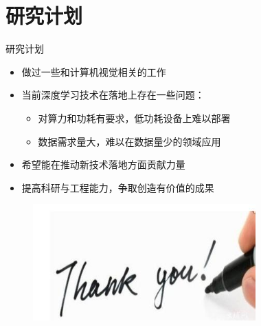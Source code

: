\documentclass{beamer}
\begin{document}
\section{研究计划}

\begin{frame}{研究计划}
  \begin{itemize}
    \item 做过一些和计算机视觉相关的工作
    \item 当前深度学习技术在落地上存在一些问题：
    \begin{itemize}
      \item 对算力和功耗有要求，低功耗设备上难以部署
      \item 数据需求量大，难以在数据量少的领域应用
    \end{itemize}
    \item 希望能在推动新技术落地方面贡献力量
    \item 提高科研与工程能力，争取创造有价值的成果
  \end{itemize}
\end{frame}


\begin{frame}
  \begin{figure}
    \includegraphics[height=4.46cm,width=8.58cm]{images/thank.jpg}
  \end{figure} 
\end{frame}
\end{document}
